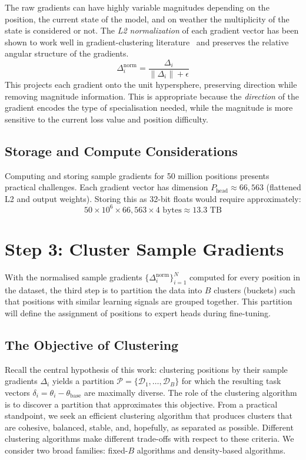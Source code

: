 The raw gradients can have highly variable magnitudes depending on the position, the current state of the model, and on weather the multiplicity of the state is considered or not. The \emph{L2 normalization} of each gradient vector has been shown to work well in gradient-clustering literature~\cite{li2025elrea,sridharan2025gradientspace} and preserves the relative angular structure of the gradients.
\[
\Delta_i^{\mathrm{norm}} = \frac{\Delta_i}{\lVert\Delta_i\rVert + \epsilon}
\]
This projects each gradient onto the unit hypersphere, preserving direction while removing magnitude information. This is appropriate because the \emph{direction} of the gradient encodes the type of specialisation needed, while the magnitude is more sensitive to the current loss value and position difficulty.

\subsection{Storage and Compute Considerations}\label{sec:sg-storage}

Computing and storing sample gradients for 50 million positions presents practical challenges. Each gradient vector has dimension \(P_{\mathrm{head}} \approx 66{,}563\) (flattened L2 and output weights). Storing this as 32-bit floats would require approximately:
\[
50 \times 10^{6} \times 66{,}563 \times 4 \text{ bytes} \approx 13.3 \text{ TB}
\]

\section{Step 3: Cluster Sample Gradients}\label{sec:step-cluster}

With the normalised sample gradients \(\{\Delta_i^{\mathrm{norm}}\}_{i=1}^N\) computed for every position in the dataset, the third step is to partition the data into \(B\) clusters (buckets) such that positions with similar learning signals are grouped together. This partition will define the assignment of positions to expert heads during fine-tuning.

\subsection{The Objective of Clustering}\label{sec:cluster-obj}

Recall the central hypothesis of this work: clustering positions by their sample gradients \(\Delta_i\) yields a partition \(\mathcal{P} = \{\mathcal{D}_1, \dots, \mathcal{D}_B\}\) for which the resulting task vectors \(\delta_i = \theta_i - \theta_{\mathrm{base}}\) are maximally diverse. The role of the clustering algorithm is to discover a partition that approximates this objective. From a practical standpoint, we seek an efficient clustering algorithm that produces clusters that are cohesive, balanced, stable, and, hopefully, as separated as possible. Different clustering algorithms make different trade-offs with respect to these criteria. We consider two broad families: fixed-\(B\) algorithms and density-based algorithms.

